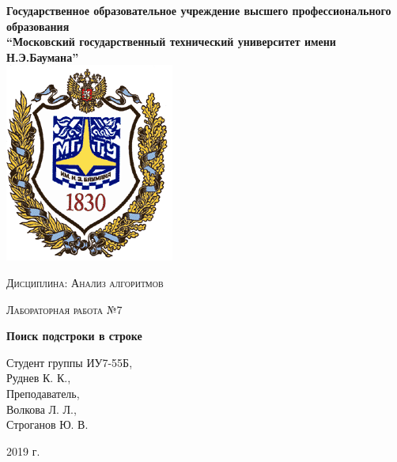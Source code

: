 \documentclass[a4paper,12pt]{report}
\begin{document}
    \begin{titlepage}

        \begin{center}
            \large
            \textbf{Государственное образовательное учреждение высшего профессионального образования\\
            “Московский государственный технический университет имени Н.Э.Баумана”\\}
            \includegraphics{bmstu-logo.png}
			\vspace{1cm}
            
            \textsc{Дисциплина: Анализ алгоритмов}
            \vspace{0.5cm}
                
            \textsc{Лабораторная работа №7}
            \vspace{1cm}
            
            {\LARGE \textbf{Поиск подстроки в строке}}
            \vspace{3cm}
                    
            \begin{flushright}
            	Студент группы ИУ7-55Б,\\   
            	Руднев К. К.,\\
            	\vspace{0.5cm}
            	Преподаватель,\\
            	Волкова Л. Л.,\\
            	Строганов Ю. В.
            	
            \end{flushright}
            \vfill
            
            2019 г.
            
            \end{center}

    \end{titlepage}
\end{document}
